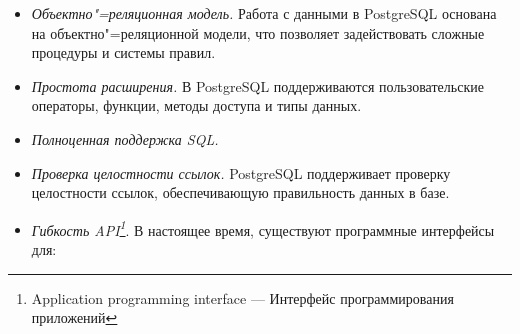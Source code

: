 \documentclass[a4paper,12pt,notitlepage,headsepline,pdftex]{scrartcl}
\begin{document}
  \begin{itemize}
    \item \emph{Объектно"=реляционная модель.}
      Работа с данными в PostgreSQL основана на объектно"=реляционной модели,
      что позволяет задействовать сложные процедуры и системы правил.
    \item \emph{Простота расширения.}
      В PostgreSQL поддерживаются пользовательские операторы, функции, методы
      доступа и типы данных.
    \item \emph{Полноценная поддержка SQL.}
    \item \emph{Проверка целостности ссылок.}
      PostgreSQL поддерживает проверку целостности ссылок, обеспечивающую
      правильность данных в базе.
    \item \emph{Гибкость API\footnote{Application programming interface ---
        \label{p:langs}
      Интерфейс программирования приложений}}.
      В настоящее время, существуют программные интерфейсы для:


\end{itemize}
\end{document}
